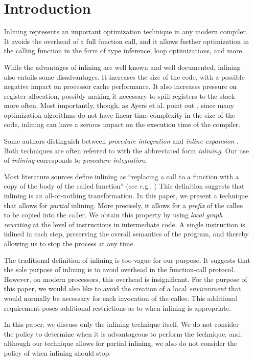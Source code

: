 \section{Introduction}

Inlining represents an important optimization technique in any modern
compiler.  It avoids the overhead of a full function call, and it
allows further optimization in the calling function in the form of
type inference, loop optimizations, and more.

While the advantages of inlining are well known and well documented,
inlining also entails some disadvantages.  It increases the size of
the code, with a possible negative impact on processor cache
performance.  It also increases pressure on register allocation,
possibly making it necessary to spill registers to the stack more
often.  Most importantly, though, as Ayers et al. point out
\cite{Ayers:1997:AI:258915.258928, Ayers:1997:AI:258916.258928}, since
many optimization algorithms do not have linear-time complexity in the
size of the code, inlining can have a serious impact on the execution
time of the compiler.

Some authors distinguish between \emph{procedure integration} and
\emph{inline expansion} \cite{Muchnick:1998:ACD:286076}.  Both
techniques are often referred to with the abbreviated form
\emph{inlining}.  Our use of \emph{inlining} corresponds to
\emph{procedure integration}.

Most literature sources define inlining as
``replacing a call to a function with a copy of the body of the called
function'' (see e.g.,
\cite{Chang:1989:IFE:74818.74840,Chang:1989:IFE:73141.74840,
  Scheifler:1977:AIS:359810.359830}) This definition suggests that
inlining is an all-or-nothing transformation.  In this paper, we
present a technique that allows for \emph{partial} inlining.  More
precisely, it allows for a \emph{prefix} of the callee to be copied
into the caller.  We obtain this property by using \emph{local graph
  rewriting} at the level of instructions in intermediate code.  A
single instruction is inlined in each step, preserving the overall
semantics of the program, and thereby allowing us to stop the process
at any time.

The traditional definition of inlining is too vague for our
purpose.  It suggests that the sole purpose of inlining is to avoid
overhead in the function-call protocol.  However, on modern
processors, this overhead is insignificant.  For the purpose of this
paper, we would also like to avoid the creation of a local
\emph{environment} that would normally be necessary for each
invocation of the callee.  This additional requirement poses
additional restrictions as to when inlining is appropriate.

In this paper, we discuss only the inlining technique itself.  We do
not consider the policy to determine when it is advantageous to
perform the technique, and, although our technique allows for partial
inlining, we also do not consider the policy of when inlining should
stop.

